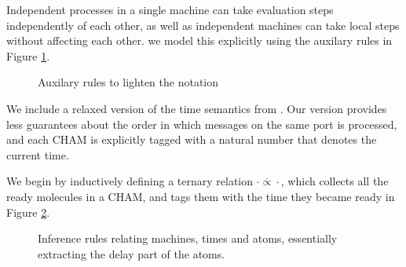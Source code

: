 Independent processes in a single machine can take evaluation steps
independently of each other, as well as independent machines can take local
steps without affecting each other.  we model this explicitly using the
auxilary rules in Figure \ref{fig:rule:aux}.
\begin{figure}[!h]
\caption{Auxilary rules to lighten the notation}\label{fig:rule:aux}
\end{figure}

We include a relaxed version of the time semantics from \cite{timed-join}. Our
version provides less guarantees about the order in which messages on the same
port is processed, and each CHAM is explicitly tagged with a natural number
that denotes the current time.

We begin by inductively defining a ternary relation $\cdot
\stackrel{\cdot}{\propto} \cdot$, which collects all the ready molecules in a
CHAM, and tags them with the time they became ready in Figure \ref{fig:rule:sched}.

\begin{figure}[!h]
\caption{Inference rules relating machines, times and atoms, essentially extracting the delay part of the atoms.}
\label{fig:rule:sched}
\end{figure}

